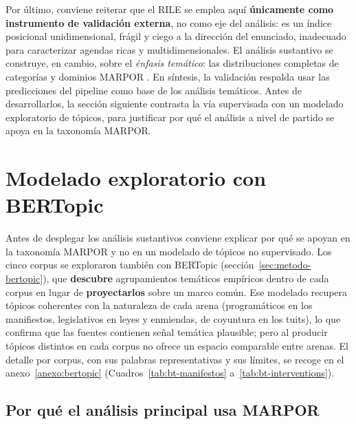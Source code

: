 Por último, conviene reiterar que el RILE se emplea aquí \textbf{únicamente como
instrumento de validación externa}, no como eje del análisis: es un índice
posicional unidimensional, frágil y ciego a la dirección del enunciado,
inadecuado para caracterizar agendas ricas y multidimensionales. El análisis
sustantivo se construye, en cambio, sobre el \emph{énfasis temático}: las
distribuciones completas de categorías y dominios MARPOR \cite{marpor_mp_v5}.
En síntesis, la validación respalda usar las predicciones del pipeline como base
de los análisis temáticos. Antes de desarrollarlos, la sección siguiente
contrasta la vía supervisada con un modelado exploratorio de tópicos, para
justificar por qué el análisis a nivel de partido se apoya en la taxonomía
MARPOR.

\section{Modelado exploratorio con BERTopic}
\label{sec:res-bertopic}

Antes de desplegar los análisis sustantivos conviene explicar por qué se apoyan en
la taxonomía MARPOR y no en un modelado de tópicos no supervisado. Los cinco
corpus se exploraron también con BERTopic \cite{grootendorst2022bertopic}
(sección~\ref{sec:metodo-bertopic}), que \textbf{descubre} agrupamientos temáticos
empíricos dentro de cada corpus en lugar de \textbf{proyectarlos} sobre un marco
común. Ese modelado recupera tópicos coherentes con la naturaleza de cada arena
(programáticos en los manifiestos, legislativos en leyes y enmiendas, de coyuntura
en los tuits), lo que confirma que las fuentes contienen señal temática plausible;
pero al producir tópicos distintos en cada corpus no ofrece un espacio comparable
entre arenas. El detalle por corpus, con sus palabras representativas y sus
límites, se recoge en el anexo~\ref{anexo:bertopic}
(Cuadros~\ref{tab:bt-manifestos} a~\ref{tab:bt-interventions}).

\subsection{Por qué el análisis principal usa MARPOR}
\label{sec:res-bt-por-que-marpor}

